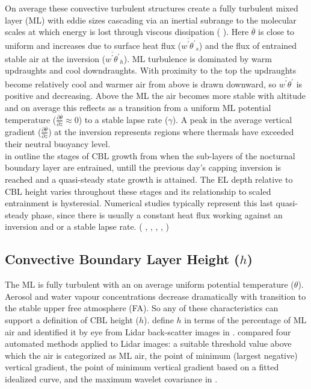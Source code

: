 On average these convective turbulent structures create a fully turbulent mixed layer (\acs{ML}) with eddie sizes cascading via an inertial subrange to the molecular scales at which energy is lost through viscous dissipation (\citeauthor{Stull-BLMetIntro} \citeyear{Stull-BLMetIntro}).  Here $\overline{\theta}$ is close to uniform and increases due to surface heat flux ($\overline{w^{'}\theta^{'}}_{s}$) and the flux of entrained stable air at the inversion ($\overline{w^{'}\theta^{'}}_{h}$).  \acs{ML} turbulence is dominated by warm updraughts and cool downdraughts.  With proximity to the top the updraughts become relatively cool and warmer air from above is drawn downward, so $\overline{w^{'}\theta^{'}}$ is positive and decreasing.  Above the \acs{ML} the air becomes more stable with altitude and on average this reflects as a transition from a uniform \acs{ML} potential temperature ($\frac{\partial \overline{\theta}}{\partial z} \approx 0$) to a stable lapse rate ($\gamma$).  A peak in the average vertical gradient ($\frac{\partial \overline{\theta}}{\partial z}$) at the inversion represents regions where thermals have exceeded their neutral buoyancy level. \\

\citeauthor{StullNelEl} in \cite{StullNelEl} outline the stages of \acs{CBL} growth from when the sub-layers of the nocturnal
boundary layer are entrained, untill the previous day's capping inversion is reached and a quasi-steady state growth 
is attained.  The \acs{EL} depth relative to \acs{CBL} height varies throughout these stages and its relationship
to scaled entrainment is hysteresial.  Numerical studies typically represent this last quasi-steady
phase, since there is usually a constant heat flux working against an inversion and or a stable lapse rate. 
(\citeauthor{SchmidtSchu} \cite{SchmidtSchu}, \citeauthor{Sorbjan} \cite{Sorbjan}, \citeauthor{SullMoengStev} \cite{SullMoengStev}, 
\citeauthor{FedConzMir04} \cite{FedConzMir04}, \citeauthor{BrooksFowler2} \cite{BrooksFowler2})  

\subsection{Convective Boundary Layer Height ($h$)}
\label{subsec:}

The \acs{ML} is fully turbulent with an on average uniform potential temperature ($\theta$). Aerosol and water vapour concentrations 
decrease dramatically with transition to the stable upper free atmosphere (\acs{FA}).  So any of these characteristics can support
a definition of \acs{CBL} height ($h$).  \citeauthor{StullNelEl} define $h$ in terms of the percentage of \acs{ML} air
and identified it by eye from Lidar back-scatter images in \cite{StullNelEl}.  \citeauthor{Traum11} compared
four automated methods applied to Lidar images: a suitable threshold value 
above which the air is categorized as \acs{ML} air,  the point of minimum (largest negative) 
vertical gradient, the point of minimum vertical gradient based on a fitted idealized curve, 
and the maximum wavelet covariance in \cite{Traum11}.\\

